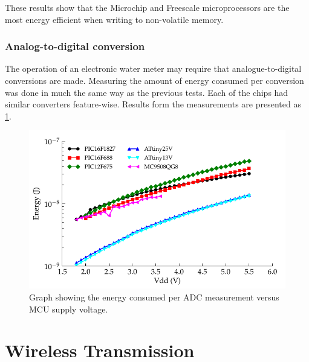       These results show that the Microchip and Freescale microprocessors are the most energy efficient when writing to non-volatile memory.



    \subsubsection{Analog-to-digital conversion}

      The operation of an electronic water meter may require that analogue-to-digital conversions are made.
      Measuring the amount of energy consumed per conversion was done in much the same way as the previous tests.
      Each of the chips had similar converters feature-wise.
      Results form the measurements are presented as \cref{fig:Energy-consumed-ADC}.

      \begin{figure}
        \centering
        \includegraphics{content/pt1/03-EnergyRequirements/graphics/Graph_ALL_ADC_JPM}
        \caption{\label{fig:Energy-consumed-ADC}Graph showing the energy consumed per ADC measurement versus MCU supply voltage.}
      \end{figure}


  \section{Wireless Transmission}

